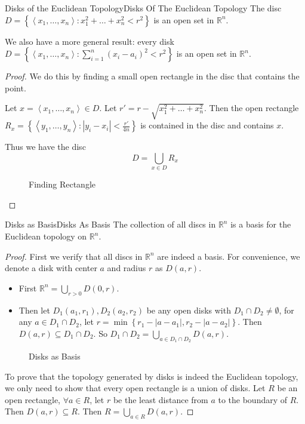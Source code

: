 \documentclass[../main.tex]{subfiles}
\begin{document}
\begin{proposition}{Disks of the Euclidean Topology}{Disks Of The Euclidean Topology}
The disc $D = \left\{ \left< x_1, \ldots ,x_n \right> : x_1^2+\ldots +x_n^2 < r^2 \right\}$ is an open set in $\mathbb{R}^n$.

We also have a more general result: every disk $D = \left\{ \left< x_1, \ldots ,x_n \right> : \sum_{i=1}^{n} (x_i-a_i)^2 < r^2 \right\}$ is an open set in $\mathbb{R}^n$.
\end{proposition}
\begin{proof}
	We do this by finding a small open rectangle in the disc that contains the point. 

	Let $x = \left< x_1, \ldots ,x_n \right> \in D$. Let $r' = r - \sqrt{x_1^2+\ldots +x_n^2}$. Then the open rectangle $R_x = \left\{ \left< y_1, \ldots ,y_n \right> : |y_i-x_i|< \frac{r'}{4n} \right\}$ is contained in the disc and contains $x$.

	Thus we have the disc
	\begin{equation*}
		D = \bigcup_{x\in D} R_x
	\end{equation*}
\begin{figure}[H]
    \centering
    \caption{Finding Rectangle}
    \label{fig:finding-rectangle}
\end{figure}
\end{proof}

\begin{theorem}{Disks as Basis}{Disks As Basis}
The collection of all discs in $\mathbb{R}^n$ is a basis for the Euclidean topology on $\mathbb{R}^n$.
\end{theorem}
\begin{proof}
First we verify that all discs in $\mathbb{R}^n$ are indeed a basis. For convenience, we denote a disk with center $a$ and radius $r$ as $D(a,r)$.
\begin{itemize}
\item First $\mathbb{R}^n = \bigcup_{r>0} D(0,r)$.
\item Then let $D_1(a_1,r_1),D_2(a_2,r_2)$ be any open disks with $D_1\cap D_2\neq \emptyset $, for any $a\in D_1\cap D_2$, let $r = \min\left\{ r_1 - |a-a_1|, r_2 - |a-a_2| \right\}$. Then $D(a,r) \subseteq D_1\cap D_2$. So $D_1\cap D_2 = \bigcup_{a\in D_1\cap D_2} D(a,r)$.
\end{itemize}
\begin{figure}[H]
    \centering
    \caption{Disks as Basis}
    \label{fig:disks-as-basis}
\end{figure}

To prove that the topology generated by disks is indeed the Euclidean topology, we only need to show that every open rectangle is a union of disks. Let $R$ be an open rectangle, $\forall a\in R$, let $r$ be the least distance from $a$ to the boundary of $R$. Then $D(a,r)\subseteq R$. Then $R = \bigcup_{a\in R} D(a,r)$.
\end{proof}
\end{document}
